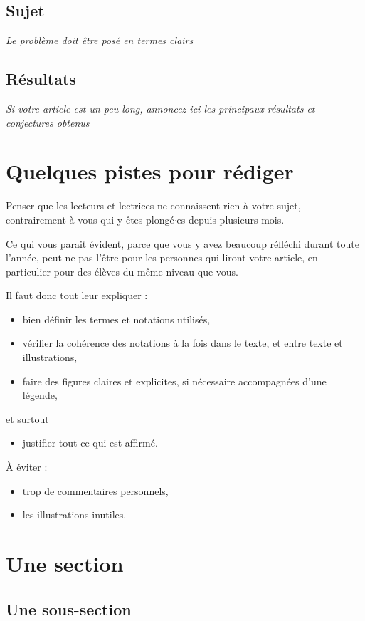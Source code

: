 \documentclass[a4paper,french,11pt]{article}
\theoremstyle{definition}\newtheorem{defn}{Definition}
\theoremstyle{remark}\newtheorem{rem}{Remarque}
\begin{document}
\subsection{Sujet}
{\em Le problème doit être posé en termes clairs}

\subsection{Résultats}
{\em Si votre article est un peu long, annoncez ici les principaux résultats et conjectures obtenus}

\section{Quelques pistes pour rédiger}
Penser que les lecteurs et lectrices ne connaissent rien à votre sujet, contrairement à vous qui y êtes plongé$\cdot$es depuis plusieurs mois. 

Ce qui vous parait évident, parce que vous y avez beaucoup réfléchi durant toute l’année, peut ne pas l’être pour les personnes qui liront votre article, en particulier pour des élèves du même niveau que vous.

Il faut donc tout leur expliquer : 
\begin{itemize}
    \item bien définir les termes et notations utilisés,
    \item vérifier la cohérence des notations à la fois dans le texte, et entre texte et illustrations,
    \item faire des figures claires et explicites, si nécessaire accompagnées d'une légende,
\end{itemize}
et surtout 
\begin{itemize}
    \item justifier tout ce qui est affirmé.
\end{itemize}
À éviter : 
\begin{itemize}
    \item trop de commentaires personnels, 
    \item les illustrations inutiles.
\end{itemize}
\section{{Une section}}
{\color{red}{\em Mettez autant de sections que vous le souhaitez, avec des titres appropriés \ldots}}

\subsection{Une sous-section}
{\color{red}{\em Et de même pour les sous-sections}}
\end{document}
